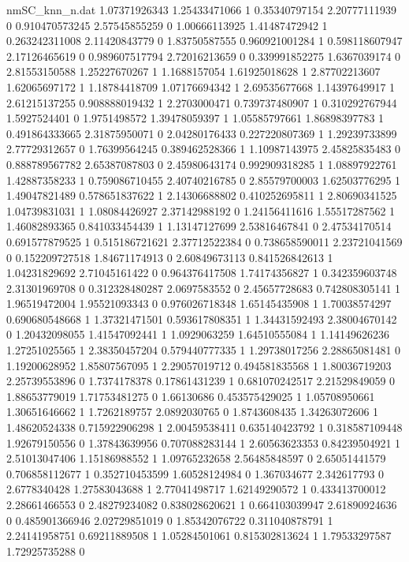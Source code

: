 \begin{filecontents}{nmSC_knn_n.dat}
1.07371926343 1.25433471066 1
0.35340797154 2.20777111939 0
0.910470573245 2.57545855259 0
1.00666113925 1.41487472942 1
0.263242311008 2.11420843779 0
1.83750587555 0.960921001284 1
0.598118607947 2.17126465619 0
0.989607517794 2.72016213659 0
0.339991852275 1.6367039174 0
2.81553150588 1.25227670267 1
1.1688157054 1.61925018628 1
2.87702213607 1.62065697172 1
1.18784418709 1.07176694342 1
2.69535677668 1.14397649917 1
2.61215137255 0.908888019432 1
2.2703000471 0.739737480907 1
0.310292767944 1.5927524401 0
1.9751498572 1.39478059397 1
1.05585797661 1.86898397783 1
0.491864333665 2.31875950071 0
2.04280176433 0.227220807369 1
1.29239733899 2.77729312657 0
1.76399564245 0.389462528366 1
1.10987143975 2.45825835483 0
0.888789567782 2.65387087803 0
2.45980643174 0.992909318285 1
1.08897922761 1.42887358233 1
0.759086710455 2.40740216785 0
2.85579700003 1.62503776295 1
1.49047821489 0.578651837622 1
2.14306688802 0.410252695811 1
2.80690341525 1.04739831031 1
1.08084426927 2.37142988192 0
1.24156411616 1.55517287562 1
1.46082893365 0.841033454439 1
1.13147127699 2.53816467841 0
2.47534170514 0.691577879525 1
0.515186721621 2.37712522384 0
0.738658590011 2.23721041569 0
0.152209727518 1.84671174913 0
2.60849673113 0.841526842613 1
1.04231829692 2.71045161422 0
0.964376417508 1.74174356827 1
0.342359603748 2.31301969708 0
0.312328480287 2.0697583552 0
2.45657728683 0.742808305141 1
1.96519472004 1.95521093343 0
0.976026718348 1.65145435908 1
1.70038574297 0.690680548668 1
1.37321471501 0.593617808351 1
1.34431592493 2.38004670142 0
1.20432098055 1.41547092441 1
1.0929063259 1.64510555084 1
1.14149626236 1.27251025565 1
2.38350457204 0.579440777335 1
1.29738017256 2.28865081481 0
1.19200628952 1.85807567095 1
2.29057019712 0.494581835568 1
1.80036719203 2.25739553896 0
1.7374178378 0.17861431239 1
0.681070242517 2.21529849059 0
1.88653779019 1.71753481275 0
1.66130686 0.453575429025 1
1.05708950661 1.30651646662 1
1.7262189757 2.0892030765 0
1.8743608435 1.34263072606 1
1.48620524338 0.715922906298 1
2.00459538411 0.635140423792 1
0.318587109448 1.92679150556 0
1.37843639956 0.707088283144 1
2.60563623353 0.84239504921 1
2.51013047406 1.15186988552 1
1.09765232658 2.56485848597 0
2.65051441579 0.706858112677 1
0.352710453599 1.60528124984 0
1.367034677 2.342617793 0
2.6778340428 1.27583043688 1
2.77041498717 1.62149290572 1
0.433413700012 2.28661466553 0
2.48279234082 0.838028620621 1
0.664103039947 2.61890924636 0
0.485901366946 2.02729851019 0
1.85342076722 0.311040878791 1
2.24141958751 0.69211889508 1
1.05284501061 0.815302813624 1
1.79533297587 1.72925735288 0

\end{filecontents}
